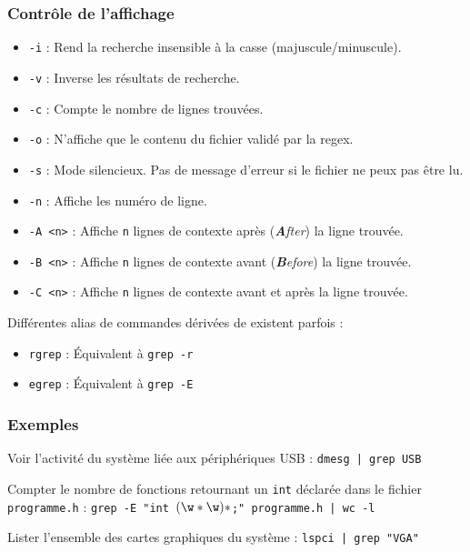 \subsubsection{Contrôle de l'affichage}
\begin{itemize}
    \item \texttt{-i} : Rend la recherche insensible à la casse (majuscule/minuscule).
    \item \texttt{-v} : Inverse les résultats de recherche.
    \item \texttt{-c} : Compte le nombre de lignes trouvées.
    \item \texttt{-o} : N'affiche que le contenu du fichier validé par la regex.
    \item \texttt{-s} : Mode silencieux. Pas de message d'erreur si le fichier ne peux pas être lu.
    \item \texttt{-n} : Affiche les numéro de ligne.
    \item \texttt{-A <n>} : Affiche \texttt{n} lignes de contexte après (\textit{\textbf{A}fter}) la ligne trouvée.
    \item \texttt{-B <n>} : Affiche \texttt{n} lignes de contexte avant (\textit{\textbf{B}efore}) la ligne trouvée.
    \item \texttt{-C <n>} : Affiche \texttt{n} lignes de contexte avant et après la ligne trouvée.
\end{itemize}

 Différentes alias de commandes dérivées de  existent parfois : 
\begin{itemize}
    \item \texttt{rgrep} : Équivalent à \texttt{grep -r}
    \item \texttt{egrep} : Équivalent à \texttt{grep -E}
\end{itemize}

\subsubsection{Exemples}

Voir l'activité du système liée aux périphériques USB : \texttt{dmesg | grep USB}

Compter le nombre de fonctions retournant un \texttt{int} déclarée dans le fichier \texttt{programme.h} :
\texttt{grep -E "int \w \((\w\** \w)*\);" programme.h | wc -l}

Lister l'ensemble des cartes graphiques du système : \texttt{lspci | grep "VGA"}

